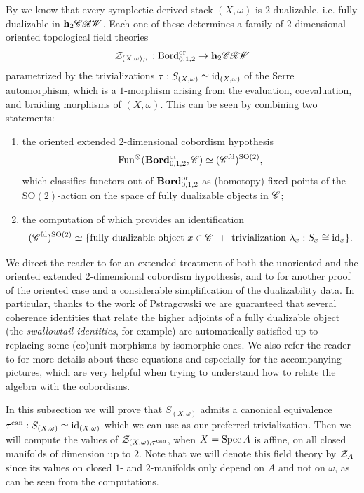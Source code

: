 By  we know that every symplectic derived stack $(X, \omega)$ is $2$-dualizable, i.e. fully dualizable in $\mathbf{h}_2 \mathscr{CRW}$. Each one of these determines a family of $2$-dimensional oriented topological field theories
\begin{equation*}
	\mathcal{Z}_{(X, \omega), \tau} : \mathrm{Bord}_{0,1,2}^{\mathrm{or}} \to \mathbf{h}_2 \mathscr{CRW}
\end{equation*}
parametrized by the trivializations $\tau : S_{(X, \omega)} \simeq \mathrm{id}_{(X, \omega)}$ of the Serre automorphism, which is a $1$-morphism arising from the evaluation, coevaluation, and braiding morphisms of $(X, \omega)$. This can be seen by combining two statements:
\begin{enumerate}
	\item the oriented extended $2$-dimensional cobordism hypothesis
	\begin{equation*}
		\mathrm{Fun}^\otimes(\mathbf{Bord}_{0,1,2}^{\mathrm{or}}, \mathscr{C}) \simeq (\mathscr{C}^{\mathrm{fd}})^{\mathrm{SO}(2)},
	\end{equation*}
	which classifies functors out of $\mathbf{Bord}_{0,1,2}^{\mathrm{or}}$ as (homotopy) fixed points of the $\mathrm{SO}(2)$-action on the space of fully dualizable objects in $\mathscr{C}$;
	\item the computation of \cite[Corollary 4.4]{HV2019} which provides an identification
	\begin{equation*}
		(\mathscr{C}^{\mathrm{fd}})^{\mathrm{SO}(2)} \simeq \{\text{fully dualizable object $x \in \mathscr{C}$ } + \text{ trivialization $\lambda_x : S_x \cong \mathrm{id}_x$}\}. 
	\end{equation*}
\end{enumerate}
We direct the reader to \cite{SP2009} for an extended treatment of both the unoriented and the oriented extended $2$-dimensional cobordism hypothesis, and to \cite{Pstragowski2014,Pstragowski2022} for another proof of the oriented case and a considerable simplification of the dualizability data. In particular, thanks to the work of Pstragowski we are guaranteed that several coherence identities that relate the higher adjoints of a fully dualizable object (the \emph{swallowtail identities}, for example) are automatically satisfied up to replacing some (co)unit morphisms by isomorphic ones. We also refer the reader to \cite[Section 2.3]{BCFR2023} for more details about these equations and especially for the accompanying pictures, which are very helpful when trying to understand how to relate the algebra with the cobordisms.

In this subsection we will prove that $S_{(X, \omega)}$ admits a canonical equivalence $\tau^\mathrm{can} : S_{(X, \omega)} \simeq \mathrm{id}_{(X, \omega)}$ which we can use as our preferred trivialization. Then we will compute the values of $\mathcal{Z}_{(X, \omega), \tau^{\mathrm{can}}}$, when $X = \operatorname{Spec} A$ is affine, on all closed manifolds of dimension up to $2$. Note that we will denote this field theory by $\mathcal{Z}_A$ since its values on closed $1$- and $2$-manifolds only depend on $A$ and not on $\omega$, as can be seen from the computations.

